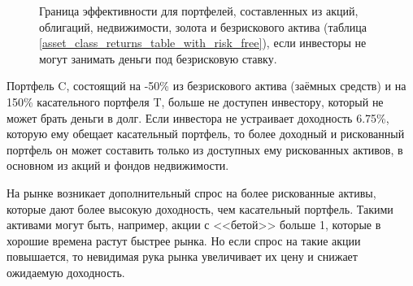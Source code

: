 \begin{figure}[h]

\caption{Граница эффективности для портфелей, составленных из акций, облигаций,
недвижимости, золота и безрискового актива (таблица 
\ref{asset_class_returns_table_with_risk_free}), если инвесторы не могут 
занимать деньги под безрисковую ставку.}
\label{efficient_frontier_with_risk_free_no_leverage}
\end{figure}

Портфель C, состоящий на -50\% из безрискового актива (заёмных средств) и на 
150\% касательного портфеля T, больше не доступен инвестору, который не может 
брать деньги в долг. Если инвестора не устраивает доходность 6.75\%, которую ему 
обещает касательный портфель, то более доходный и рискованный портфель он может 
составить только из доступных ему  рискованных активов, в основном из акций и 
фондов недвижимости.

На рынке возникает дополнительный спрос на более рискованные активы, которые 
дают более высокую доходность, чем касательный портфель. Такими активами могут
быть, например, акции с <<бетой>> больше 1, которые в хорошие времена растут
быстрее рынка. Но если спрос на такие акции повышается, то невидимая рука рынка
увеличивает их цену и снижает ожидаемую доходность.

